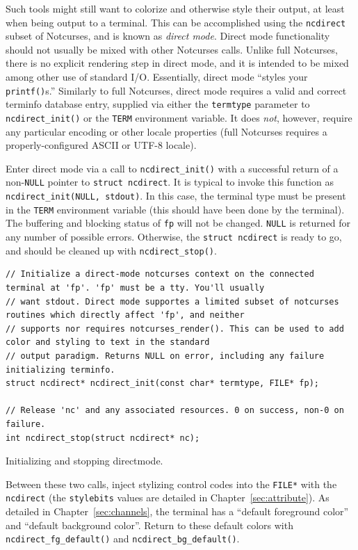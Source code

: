 \documentclass[letterpaper,10pt]{article}
\begin{document}
 Such tools might still want to colorize and otherwise style their output, at
least when being output to a terminal. This can be accomplished using the
\texttt{ncdirect} subset of Notcurses, and is known as \textit{direct mode}. Direct
mode functionality should not usually be mixed with other Notcurses calls.
Unlike full Notcurses, there is no explicit rendering step in direct mode, and
it is intended to be mixed among other use of standard I/O. Essentially, direct
mode ``styles your \texttt{printf()}s.'' Similarly to full Notcurses, direct mode
requires a valid and correct terminfo database entry, supplied via either the
\texttt{termtype} parameter to \texttt{ncdirect\_init()} or the \texttt{TERM} environment
variable. It does \textit{not}, however, require any particular encoding or
other locale properties\cite{setlocale} (full Notcurses requires a
properly-configured ASCII or UTF-8 locale).

Enter direct mode via a call to \texttt{ncdirect\_init()} with a successful
return of a non-\texttt{NULL} pointer to \texttt{struct ncdirect}. It is
typical to invoke this function as \texttt{ncdirect\_init(NULL, stdout)}. In this case, the terminal type must be present in the
\texttt{TERM} environment variable (this should have been done by the
terminal). The buffering and blocking status of \texttt{fp} will not be
changed. \texttt{NULL} is returned for any number of possible errors.
Otherwise, the \texttt{struct ncdirect} is ready to go, and should be cleaned
up with \texttt{ncdirect\_stop()}.

\begin{listing}[!htbp]
\begin{verbatim}
// Initialize a direct-mode notcurses context on the connected terminal at 'fp'. 'fp' must be a tty. You'll usually
// want stdout. Direct mode supportes a limited subset of notcurses routines which directly affect 'fp', and neither
// supports nor requires notcurses_render(). This can be used to add color and styling to text in the standard
// output paradigm. Returns NULL on error, including any failure initializing terminfo.
struct ncdirect* ncdirect_init(const char* termtype, FILE* fp);

// Release 'nc' and any associated resources. 0 on success, non-0 on failure.
int ncdirect_stop(struct ncdirect* nc);
\end{verbatim}
\caption{Initializing and stopping directmode.}
\end{listing}

Between these two calls, inject stylizing control codes into the \texttt{FILE*} with
the \texttt{ncdirect} (the \texttt{stylebits} values are detailed in Chapter~\ref{sec:attribute}).
As detailed in Chapter~\ref{sec:channels}, the terminal has a ``default foreground color''
and ``default background color''. Return to these default colors with
\texttt{ncdirect\_fg\_default()} and \texttt{ncdirect\_bg\_default()}.
\end{document}

